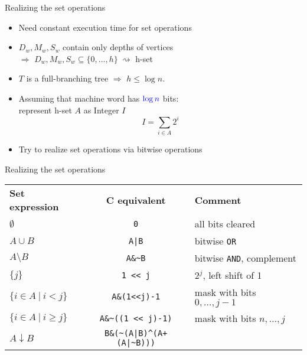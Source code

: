 \documentclass[18pt]{beamer}
\begin{document}
\begin{frame}{Realizing the set operations}
	\begin{itemize}
		\item Need constant execution time for {\color{blue}set operations}
		\bigskip
		\item $D_w, M_w, S_w$ contain only depths of vertices \\
			 $\Rightarrow$ $D_w, M_w, S_w \subseteq \{0,...,h\} \ \rightsquigarrow$ {\color{blue} h-set}
		\bigskip
		\item $T$ is a full-branching tree $\Rightarrow$ $h \le \log n$. 
		\bigskip
		\item Assuming that machine word has $\color{blue} \log n$ bits: \\
			  represent h-set $A$ as Integer $I$
			  \[ I = \sum_{i\in A} 2^i \]
		\item Try to realize set operations via bitwise operations
		
	\end{itemize}
\end{frame}
\begin{frame}{Realizing the set operations}
	
	\begin{tabular}[]{ l c l }
		\textbf{Set expression} & \textbf{C equivalent} & \textbf{Comment} \\
		$\emptyset$ & \texttt{0} & all bits cleared \\
		$A \cup B$ & \texttt{A|B} & bitwise \texttt{OR} \\
		$A \setminus B$ & \texttt{A\&\textasciitilde B}  & bitwise \texttt{AND}, complement \\
		$\{j\}$ & \texttt{1 << j} & $2^j$, left shift of 1 \\
		$\{i \in A \ | \ i < j \}$ & \texttt{A\&(1<<j)-1} & mask with bits $0,\dots,j-1$\\
		$\{i\in A \ | \ i \ge j \} $ & \texttt{A\&\textasciitilde((1 << j)-1)}	& mask with bits $n,\dots,j$ \\
		$A \downarrow B$ & \texttt{B\&(\textasciitilde(A|B)\^{}(A+(A|\textasciitilde B)))}
	\end{tabular}
 \end{frame}
\end{document}
